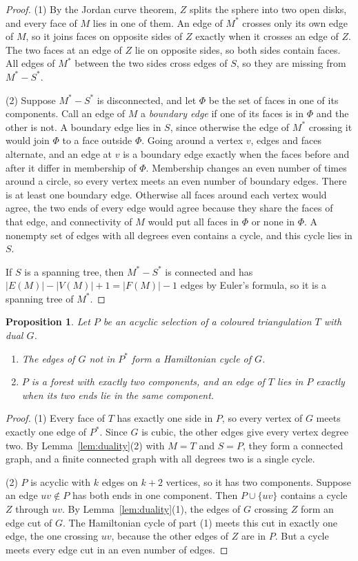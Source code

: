 \documentclass[10pt]{amsart}
\numberwithin{equation}{section}
\newtheorem{proposition}[equation]{Proposition}
\theoremstyle{definition}
\theoremstyle{remark}
\newcommand{\T}{T}
\begin{document}
\begin{proof}
(1) By the Jordan curve theorem, $Z$ splits the sphere into two open disks, and every face of $M$ lies in one of them.
An edge of $M^*$ crosses only its own edge of $M$, so it joins faces on opposite sides of $Z$ exactly when it crosses an edge of $Z$.
The two faces at an edge of $Z$ lie on opposite sides, so both sides contain faces.
All edges of $M^*$ between the two sides cross edges of $S$, so they are missing from $M^*-S^*$.

(2) Suppose $M^*-S^*$ is disconnected, and let $\Phi$ be the set of faces in one of its components.
Call an edge of $M$ a \emph{boundary edge} if one of its faces is in $\Phi$ and the other is not.
A boundary edge lies in $S$, since otherwise the edge of $M^*$ crossing it would join $\Phi$ to a face outside $\Phi$.
Going around a vertex $v$, edges and faces alternate, and an edge at $v$ is a boundary edge exactly when the faces before and after it differ in membership of $\Phi$.
Membership changes an even number of times around a circle, so every vertex meets an even number of boundary edges.
There is at least one boundary edge. Otherwise all faces around each vertex would agree, the two ends of every edge would agree because they share the faces of that edge, and connectivity of $M$ would put all faces in $\Phi$ or none in $\Phi$.
A nonempty set of edges with all degrees even contains a cycle, and this cycle lies in $S$.

If $S$ is a spanning tree, then $M^*-S^*$ is connected and has $|E(M)|-|V(M)|+1=|F(M)|-1$ edges by Euler's formula, so it is a spanning tree of $M^*$.
\end{proof}

\begin{proposition}\label{prop:target}
Let $P$ be an acyclic selection of a coloured triangulation $\T$ with dual $G$.
\begin{enumerate}
\item The edges of $G$ not in $P^*$ form a Hamiltonian cycle of $G$.
\item $P$ is a forest with exactly two components, and an edge of $\T$ lies in $P$ exactly when its two ends lie in the same component.
\end{enumerate}
\end{proposition}

\begin{proof}
(1) Every face of $\T$ has exactly one side in $P$, so every vertex of $G$ meets exactly one edge of $P^*$.
Since $G$ is cubic, the other edges give every vertex degree two.
By Lemma~\ref{lem:duality}(2) with $M=\T$ and $S=P$, they form a connected graph, and a finite connected graph with all degrees two is a single cycle.

(2) $P$ is acyclic with $k$ edges on $k+2$ vertices, so it has two components.
Suppose an edge $uv\notin P$ has both ends in one component.
Then $P\cup\{uv\}$ contains a cycle $Z$ through $uv$.
By Lemma~\ref{lem:duality}(1), the edges of $G$ crossing $Z$ form an edge cut of $G$.
The Hamiltonian cycle of part (1) meets this cut in exactly one edge, the one crossing $uv$, because the other edges of $Z$ are in $P$.
But a cycle meets every edge cut in an even number of edges.
\end{proof}
\end{document}
